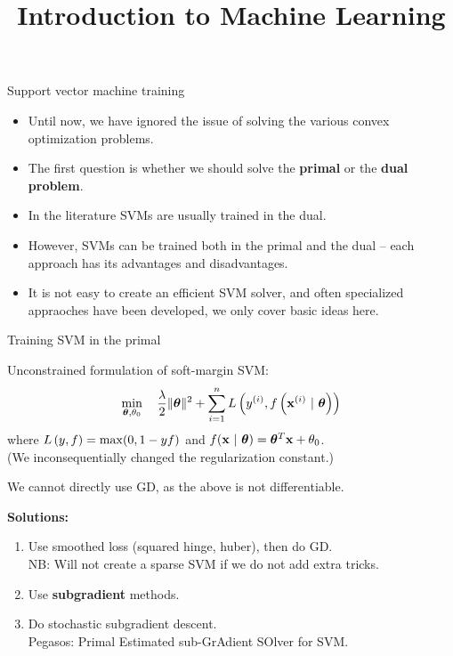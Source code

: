 \documentclass[11pt,compress,t,notes=noshow, xcolor=table]{beamer}
\title{Introduction to Machine Learning}
\begin{document}

\begin{vbframe}{Support vector machine training}

  \begin{itemize}
    \item Until now, we have ignored the issue of solving the
    various convex optimization problems.
    \item The first question is whether we should solve the \textbf{primal} or the \textbf{dual problem}.
    \item In the literature SVMs are usually trained in the dual.
    \item However, SVMs can be trained both in the primal and the dual -- each approach has its advantages and disadvantages.
    \item It is not easy to create an efficient SVM solver, and often specialized appraoches have been developed, 
      we only cover basic ideas here.
  \end{itemize}

\end{vbframe}

\begin{vbframe}{Training SVM in the primal}

Unconstrained formulation of soft-margin SVM:
$$
\min\limits_{\bm{\theta}, \theta_0} \quad \frac{\lambda}{2} \|\bm{\theta}\|^2 + \sum\limits_{i=1}^n L\left(y^{(i)}, f\left(\mathbf{x}^{(i)} ~|~ \bm{\theta}\right)\right)
$$
where $L\left(y, f\right) = \max(0, 1 -  y f)$ and $f(\mathbf{x} ~|~ \bm{\theta}) = \bm{\theta}^T \mathbf{x} + \theta_0$.\\ 
(We inconsequentially changed the regularization constant.)

\vspace*{2mm}

We cannot directly use GD, as the above is not differentiable.

\vspace*{2mm}

\textbf{Solutions:}
\begin{enumerate}
\item Use smoothed loss (squared hinge, huber), then do GD.\\
  NB: Will not  create a sparse SVM if we do not add extra tricks.
\item Use \textbf{subgradient} methods.
\item Do stochastic subgradient descent.\\
  Pegasos: Primal Estimated sub-GrAdient SOlver for SVM.
\end{enumerate}
\end{vbframe}
\end{document}
